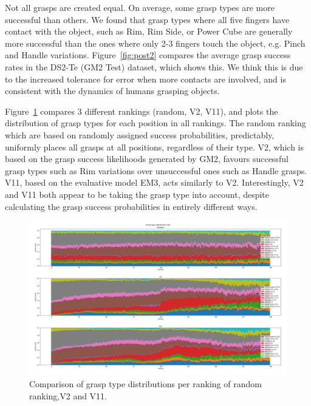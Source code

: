 Not all grasps are created equal. On average, some grasp types are more successful than others. We found that grasp types where all five fingers have contact with the object, such as Rim, Rim Side, or Power Cube are generally more successful than the ones where only 2-3 fingers touch the object, e.g. Pinch and Handle variations. Figure~\ref{fig:post2} compares the average grasp success rates in the DS2-Te (GM2 Test) dataset, which shows this. We think this is due to the increased tolerance for error when more contacts are involved, and is consistent with the dynamics of humans grasping objects. 

Figure~\ref{fig:post6} compares 3 different rankings (random, V2, V11), and plots the distribution of grasp types for each position in all rankings. The random ranking which are based on randomly assigned success probabilities, predictably, uniformly places all grasps at all positions, regardless of their type. V2, which is based on the grasp success likelihoods generated by GM2, favours successful grasp types such as Rim variations over unsuccessful ones such as Handle grasps. V11, based on the evaluative model EM3, acts similarly to V2. Interestingly, V2 and V11 both appear to be taking the grasp type into account, despite calculating the grasp success probabilities in entirely different ways.

\begin{figure}
\centering
\includegraphics[width=0.8\columnwidth]{images/post-analysis/[6] Grasp_type_distributions_all.png}
\caption{Comparison of grasp type distributions per ranking of random ranking,V2 and V11.}
\label{fig:post6}
\end{figure}


